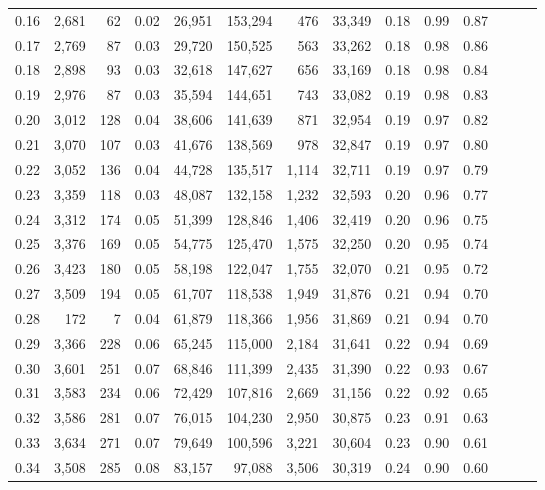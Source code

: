 \begin{tabular}{rrrrrrrrrrrrrr}
0.16 &  2,681 &   62 &  0.02 &   26,951 &  153,294 &     476 &  33,349 &  0.18 &  0.99 &      0.87 \\
0.17 &  2,769 &   87 &  0.03 &   29,720 &  150,525 &     563 &  33,262 &  0.18 &  0.98 &      0.86 \\
0.18 &  2,898 &   93 &  0.03 &   32,618 &  147,627 &     656 &  33,169 &  0.18 &  0.98 &      0.84 \\
0.19 &  2,976 &   87 &  0.03 &   35,594 &  144,651 &     743 &  33,082 &  0.19 &  0.98 &      0.83 \\
0.20 &  3,012 &  128 &  0.04 &   38,606 &  141,639 &     871 &  32,954 &  0.19 &  0.97 &      0.82 \\
0.21 &  3,070 &  107 &  0.03 &   41,676 &  138,569 &     978 &  32,847 &  0.19 &  0.97 &      0.80 \\
0.22 &  3,052 &  136 &  0.04 &   44,728 &  135,517 &   1,114 &  32,711 &  0.19 &  0.97 &      0.79 \\
0.23 &  3,359 &  118 &  0.03 &   48,087 &  132,158 &   1,232 &  32,593 &  0.20 &  0.96 &      0.77 \\
0.24 &  3,312 &  174 &  0.05 &   51,399 &  128,846 &   1,406 &  32,419 &  0.20 &  0.96 &      0.75 \\
0.25 &  3,376 &  169 &  0.05 &   54,775 &  125,470 &   1,575 &  32,250 &  0.20 &  0.95 &      0.74 \\
0.26 &  3,423 &  180 &  0.05 &   58,198 &  122,047 &   1,755 &  32,070 &  0.21 &  0.95 &      0.72 \\
0.27 &  3,509 &  194 &  0.05 &   61,707 &  118,538 &   1,949 &  31,876 &  0.21 &  0.94 &      0.70 \\
0.28 &    172 &    7 &  0.04 &   61,879 &  118,366 &   1,956 &  31,869 &  0.21 &  0.94 &      0.70 \\
0.29 &  3,366 &  228 &  0.06 &   65,245 &  115,000 &   2,184 &  31,641 &  0.22 &  0.94 &      0.69 \\
0.30 &  3,601 &  251 &  0.07 &   68,846 &  111,399 &   2,435 &  31,390 &  0.22 &  0.93 &      0.67 \\
0.31 &  3,583 &  234 &  0.06 &   72,429 &  107,816 &   2,669 &  31,156 &  0.22 &  0.92 &      0.65 \\
0.32 &  3,586 &  281 &  0.07 &   76,015 &  104,230 &   2,950 &  30,875 &  0.23 &  0.91 &      0.63 \\
0.33 &  3,634 &  271 &  0.07 &   79,649 &  100,596 &   3,221 &  30,604 &  0.23 &  0.90 &      0.61 \\
0.34 &  3,508 &  285 &  0.08 &   83,157 &   97,088 &   3,506 &  30,319 &  0.24 &  0.90 &      0.60 \\

\end{tabular}
